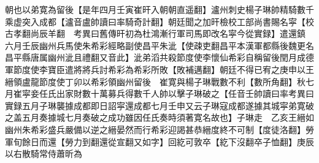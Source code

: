 朝也以弟寛為留後【是年四月壬寅崔旰入朝朝直遥翻】瀘州刺史楊子琳帥精騎數千乘虚突入成都【瀘音盧帥讀曰率騎奇計翻】朝廷聞之加旰檢校工部尚書賜名寜【校古孝翻尚辰羊翻　考異曰舊傳旰初為杜鴻漸行軍司馬即改名寜今從實録】遣還鎮　六月壬辰幽州兵馬使朱希彩經略副使昌平朱泚【使疎吏翻昌平本漢軍都縣後魏更名昌平縣唐属幽州泚且禮翻又音此】泚弟滔共殺節度使李懷仙希彩自稱留後閏月成德軍節度使李寶臣遣將將兵討希彩為希彩所敗【敗補邁翻】朝廷不得已宥之庚申以王縉領盧龍節度使丁卯以希彩領幽州留後　崔寛與楊子琳戰數不利【數所角翻】秋七月崔寜妾任氏出家財數十萬募兵得數千人帥以擊子琳破之【任音壬帥讀曰率考異曰實録五月子琳襲據成都即日詔寜還成都七月壬申又云子琳寇成都遂據其城寜弟寛破之盖五月奏據城七月奏破之成功雖因任氏奏時須著寛名故也】子琳走　乙亥王縉如幽州朱希彩盛兵嚴備以逆之縉晏然而行希彩迎謁甚恭縉度終不可制【度徒洛翻】勞軍旬餘日而還【勞力到翻還從宣翻又如字】回紇可敦卒【紇下沒翻卒子恤翻】庚辰以右散騎常侍蕭昕為

